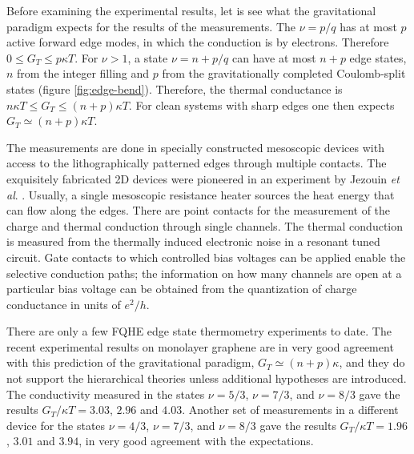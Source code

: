\documentclass[aps,preprint,12pt,tightenlines]{revtex4}%
\begin{document}
Before examining the experimental results, let is see what the gravitational
paradigm expects for the results of the measurements. The $\nu=p/q$ has at
most $p$ active forward edge modes, in which the conduction is by electrons.
Therefore $0\leq G_{T}\leq p\kappa T$. For $\nu>1$, a state $\nu=n+p/q$ can
have at most $n+p$ edge states, $n$ from the integer filling and $p$ from the
gravitationally completed Coulomb-split states (figure \ref{fig:edge-bend}). Therefore, the thermal
conductance is $n\kappa T\leq G_{T}\leq\left(  n+p\right)  \kappa T$. For
clean systems with sharp edges one then expects $G_{T}\simeq\left(
n+p\right)  \kappa T$.

The measurements are done in specially constructed mesoscopic devices with
access to the lithographically patterned edges through multiple contacts. The
exquisitely fabricated 2D devices were pioneered in an experiment by Jezouin
\textit{et al}. \cite{Jezouin2013}. Usually, a single mesoscopic resistance
heater sources the heat energy that can flow along the edges. There are point
contacts for the measurement of the charge and thermal conduction through
single channels. The thermal conduction is measured from the thermally induced
electronic noise in a resonant tuned circuit. Gate contacts to which
controlled bias voltages can be applied enable the selective conduction paths;
the information on how many channels are open at a particular bias voltage can
be obtained from the quantization of charge conductance in units of $e^{2}/h$.

There are only a few FQHE edge state thermometry experiments to date. The
recent experimental results on monolayer graphene \cite{AnindyaDas2021} are in
very good agreement with this prediction of the gravitational paradigm,
$G_{T}\simeq\left(  n+p\right)  \kappa$, and they do not support the
hierarchical theories unless additional hypotheses are introduced. The
conductivity measured in the states $\nu=5/3$, $\nu=7/3$, and $\nu=8/3$ gave
the results $G_{T}/\kappa T=3.03$, $2.96$ and $4.03$. Another set of
measurements in a different device for the states $\nu=4/3$, $\nu=7/3$, and
$\nu=8/3$ gave the results $G_{T}/\kappa T=1.96$, $3.01$ and $3.94$, in very
good agreement with the expectations.
\end{document}
